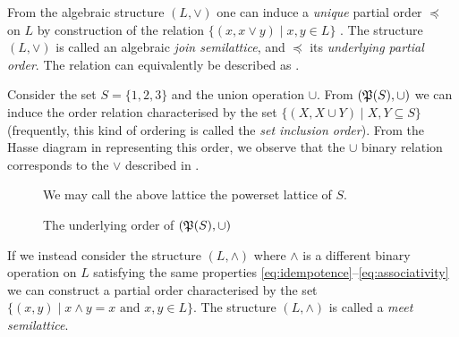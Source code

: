 From the algebraic structure $(L, \vee)$ one can induce a \textit{unique} partial order $\preceq$ on $L$ by construction of the relation $\{( x, x \vee y) \mid x,y \in L \}$
\cite[pp. 173]{bergman2015invitation}. The structure $(L, \vee)$ is called an algebraic \textit{join semilattice}, and $\preceq$ its \textit{underlying partial order}. The relation
can equivalently be described as  \cite[pp.173]{bergman2015invitation}.
%
\begin{example}
  \label{example:power-set-lattice} Consider the set $S = \{1,2,3\}$ and the union operation $\cup$. From $(\mathfrak{P}({S}), \cup)$ we can induce the order relation characterised by the
  set $\{(X, X \cup Y) \mid X,Y \subseteq S \}$ (frequently, this kind of ordering is called the \textit{set inclusion order}). From the Hasse diagram in 
  representing this order, we observe that the $\cup$ binary relation corresponds to the $\vee$ described in .
  \begin{figure}[H]
    \centering
    \caption{The underlying order of $(\mathfrak{P}({S}), \cup)$}
    \label{figure:set-inclusion-order}

    We may call the above lattice the powerset lattice of $S$.
  \end{figure}
\end{example}

If we instead consider the structure $(L, \wedge)$ where $\wedge$ is a different binary operation on $L$ satisfying the same properties \cref{eq:idempotence}--\cref{eq:associativity}
we can construct a partial order characterised by the set $\{(x,y) \mid x \wedge y = x \text{ and }x,y \in L\}$. The structure $(L, \wedge)$ is called a \textit{meet semilattice}.

